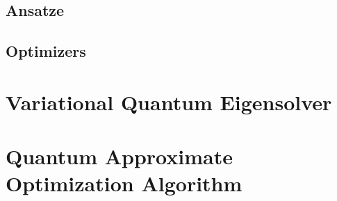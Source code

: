 \subsection{Ansatze}

\subsection{Optimizers}


\section{Variational Quantum Eigensolver}

\section{Quantum Approximate Optimization Algorithm}